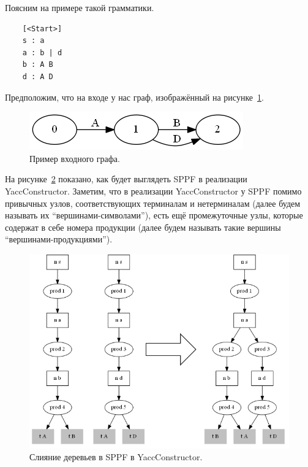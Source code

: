Поясним на примере такой грамматики.

\begin{verbatim}
    [<Start>] 
    s : a 
    a : b | d 
    b : A B
    d : A D 
\end{verbatim}

Предположим, что на входе у нас граф, изображённый на рисунке~\ref{sppf_input}.

\begin{figure}[t]
\centering
\includegraphics[width=0.5\linewidth]{Ivanov/Pictures/SPPF_input.png}
\caption{Пример входного графа.}
\label{sppf_input}
\end{figure}

На рисунке~\ref{sppf_yc} показано, как будет выглядеть SPPF в реализации YaccConstructor. Заметим, что в реализации YaccConstructor у SPPF помимо привычных узлов, соответствующих терминалам и нетерминалам (далее будем называть их ``вершинами-символами''), есть ещё промежуточные узлы, которые содержат в себе номера продукции (далее будем называть такие вершины ``вершинами-продукциями''). 

\begin{figure}[t]
    \centering
    \includegraphics[width=\linewidth]{Ivanov/Pictures/sppf_yc.png}
    \caption{Слияние деревьев в SPPF в YaccConstructor.}
    \label{sppf_yc}
\end{figure}

